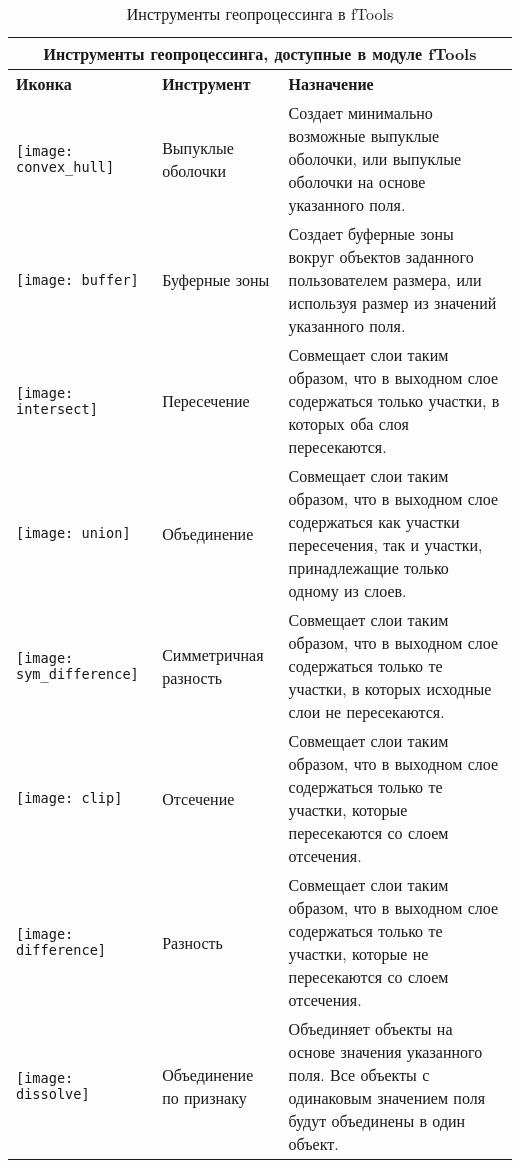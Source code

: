 \begin{table}[ht]
\centering
 \begin{tabular}{|m{1cm}|m{3cm}|m{9cm}|}
 \hline \multicolumn{3}{|c|}{\textbf{Инструменты геопроцессинга, доступные в  модуле fTools}} \\
 \hline \textbf{Иконка} & \textbf{Инструмент} & \textbf{Назначение} \\
 \hline \texttt{[image: convex\_hull]} & Выпуклые оболочки & Создает
 минимально возможные выпуклые оболочки, или выпуклые оболочки
 на основе указанного поля. \\
 \hline \texttt{[image: buffer]} & Буферные зоны & Создает
 буферные зоны вокруг объектов заданного пользователем размера, или используя
 размер из значений указанного поля. \\
 \hline \texttt{[image: intersect]} & Пересечение & Совмещает
 слои таким образом, что в выходном слое содержаться только участки, в которых оба слоя пересекаются. \\
 \hline \texttt{[image: union]} & Объединение & Совмещает
 слои таким образом, что в выходном слое содержаться как участки
 пересечения, так и участки, принадлежащие только одному из слоев. \\
 \hline \texttt{[image: sym\_difference]} & Симметричная разность &
 Совмещает слои таким образом, что в выходном слое содержаться
 только те участки, в которых исходные слои не пересекаются. \\
 \hline \texttt{[image: clip]} & Отсечение & Совмещает слои
 таким образом, что в выходном слое содержаться  только те участки,
 которые пересекаются со слоем отсечения. \\
 \hline \texttt{[image: difference]} & Разность & Совмещает
 слои таким образом, что в выходном слое содержаться только те участки,
 которые не пересекаются со слоем отсечения. \\
 \hline \texttt{[image: dissolve]} & Объединение по признаку & Объединяет
 объекты на основе значения указанного поля. Все объекты с одинаковым значением поля
 будут объединены в один объект. \\
 \hline
\end{tabular}
\caption{Инструменты геопроцессинга в fTools}\label{tab:ftool_geoprocessing}
\end{table}

